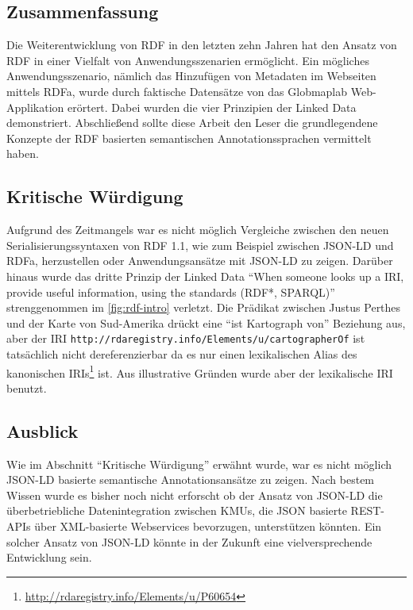 \documentclass[float=false, crop=false]{standalone}
\begin{document}
\subsection{Zusammenfassung}

Die Weiterentwicklung von RDF in den letzten zehn Jahren hat den Ansatz von RDF in einer Vielfalt von Anwendungsszenarien ermöglicht. Ein mögliches Anwendungsszenario, nämlich das Hinzufügen von Metadaten im Webseiten mittels RDFa, wurde durch faktische Datensätze von das Globmaplab Web-Applikation erörtert. Dabei wurden die vier Prinzipien der Linked Data demonstriert. Abschließend sollte diese Arbeit den Leser die grundlegendene Konzepte der RDF basierten semantischen Annotationssprachen vermittelt haben.

\subsection{Kritische Würdigung}
Aufgrund des Zeitmangels war es nicht möglich Vergleiche zwischen den neuen Serialisierungssyntaxen von RDF 1.1, wie zum Beispiel zwischen JSON-LD und RDFa, herzustellen oder Anwendungsansätze mit JSON-LD zu zeigen. Darüber hinaus wurde das dritte Prinzip der Linked Data \hyphenquote{german}{When someone looks up a IRI, provide useful information, using the standards (RDF*, SPARQL)} strenggenommen im \autoref{fig:rdf-intro} verletzt. Die Prädikat zwischen Justus Perthes und der Karte von Sud-Amerika drückt eine \hyphenquote{german}{ist Kartograph von} Beziehung aus, aber der IRI \texttt{http://rdaregistry.info/Elements/u/cartographerOf} ist tatsächlich nicht dereferenzierbar da es nur einen lexikalischen Alias des kanonischen IRIs\footnote{\url{http://rdaregistry.info/Elements/u/P60654}} ist. Aus illustrative Gründen wurde aber der lexikalische IRI benutzt. 

\subsection{Ausblick}
Wie im Abschnitt \hyphenquote{german}{Kritische Würdigung} erwähnt wurde, war es nicht möglich JSON-LD basierte semantische Annotationsansätze zu zeigen. Nach bestem Wissen wurde es bisher noch nicht erforscht ob der Ansatz von JSON-LD die überbetriebliche Datenintegration zwischen KMUs, die JSON basierte REST-APIs über XML-basierte Webservices bevorzugen, unterstützen könnten\footnotemark{}. Ein solcher Ansatz von JSON-LD könnte in der Zukunft eine vielversprechende Entwicklung sein.
\end{document}
